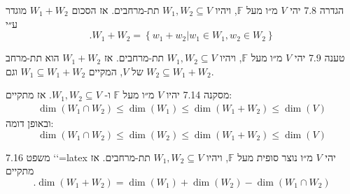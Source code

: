 \documentclass[a4paper, 11pt]{article}
\newcommand{\Set}[1]{\left\{#1\right\}}
\begin{document}
\begin{envbox}[defcolor]{הגדרה 7.8}
יהי $V$ מ״ו מעל $\mathbb{F}$, ויהיו $W_1,W_2\subseteq V$ תת-מרחבים. אז הסכום $W_1+W_2$ מוגדר ע״י 
\[
.W_1+W_2=\Set{w_1+w_2|w_1\in W_1,w_2\in W_2}
\]
\end{envbox}

\begin{envbox}[thmcolor]{טענה 7.9}
יהי $V$ מ״ו מעל $\mathbb{F}$, ויהיו $W_1,W_2\subseteq V$ תת-מרחבים. אז $W_1+W_2$ הוא תת-מרחב של $V$, המקיים $W_1\subseteq W_1+W_2$ וגם $W_2\subseteq W_1+W_2$.
\end{envbox}

\begin{envbox}[thmcolor]{מסקנה 7.14}
יהיו $V$ מ״ו מעל $\mathbb{F}$ ו- $W_1,W_2\subseteq V$. אז מתקיים: 
\[
\begin{aligned}
\dim(W_1\cap W_2)\leq \dim(W_1)\leq\dim(W_1+W_2)\leq\dim(V)
\end{aligned}
\]
 ובאופן דומה: 
\[
\dim(W_1\cap W_2)\leq \dim(W_2)\leq\dim(W_1+W_2)\leq\dim(V)
\]
\end{envbox}

\begin{envbox}[thmcolor]{משפט 7.16}
`\label{thm:dim-formula}`{=latex} יהי $V$ מ״ו נוצר סופית מעל $\mathbb{F}$, ויהיו $W_1,W_2\subseteq V$ תת-מרחבים. אז מתקיים 
\[
.\dim(W_1+W_2)=\dim(W_1)+\dim(W_2)-\dim(W_1\cap W_2)
\]
\end{envbox}

\newpage
\end{document}
